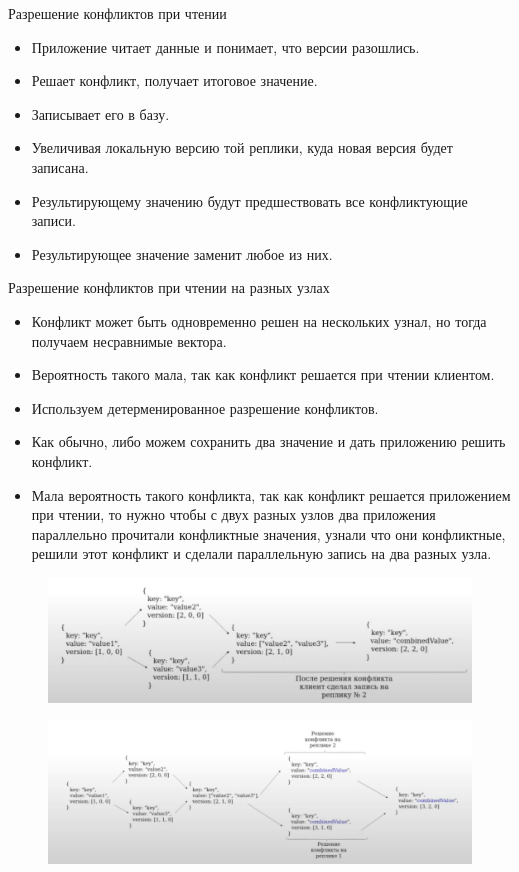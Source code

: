 \begin{definition}
  Разрешение конфликтов при чтении
\end{definition}
\begin{itemize}
  \item Приложение читает данные и понимает, что версии разошлись.
  \item Решает конфликт, получает итоговое значение.
  \item Записывает его в базу.
  \item Увеличивая локальную версию той реплики, куда новая версия будет записана.
  \item Результирующему значению будут предшествовать все конфликтующие записи.
  \item Результирующее значение заменит любое из них.
\end{itemize}
\begin{definition}
  Разрешение конфликтов при чтении на разных узлах
\end{definition}
\begin{itemize}
  \item Конфликт может быть одновременно решен на нескольких узнал, но тогда получаем несравнимые вектора.
  \item Вероятность такого мала, так как конфликт решается при чтении клиентом.
  \item Используем детерменированное разрешение конфликтов.
  \item Как обычно, либо можем сохранить два значение и дать приложению решить конфликт.
  \item Мала вероятность такого конфликта, так как конфликт решается приложением при чтении, то нужно чтобы с двух разных узлов два приложения параллельно прочитали конфликтные значения, узнали что они конфликтные, решили этот конфликт и сделали параллельную запись на два разных узла.
\end{itemize}
\begin{figure}[h]
    \centering
    \includegraphics[scale = 0.5]{../assets/5.png}
    \caption{}
\end{figure}
\begin{figure}[h]
    \centering
    \includegraphics[scale = 0.5]{../assets/6.png}
    \caption{}
\end{figure}
